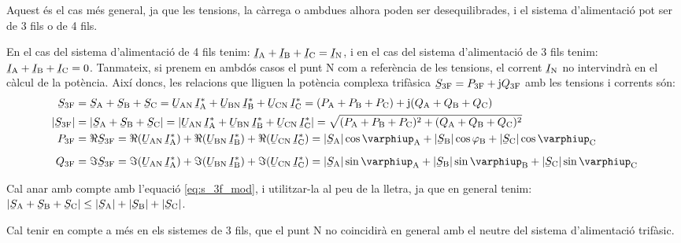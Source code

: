 Aquest és el cas més general, ja que les tensions, la càrrega o
ambdues alhora  poden ser desequilibrades, i el sistema
d'alimentació pot ser de 3 fils o de 4 fils.

En el cas del sistema d'alimentació de 4 fils tenim:
$\cmplx{I}\ped{A}+\cmplx{I}\ped{B}+\cmplx{I}\ped{C}=\cmplx{I}\ped{N}$, i
en el cas del sistema d'alimentació de 3 fils tenim:
$\cmplx{I}\ped{A}+\cmplx{I}\ped{B}+\cmplx{I}\ped{C}=0$. Tanmateix,
si prenem en ambdós casos el punt N com a referència de les
tensions, el corrent $\cmplx{I}\ped{N}$ no intervindrà en el càlcul de
la potència. Així doncs, les relacions que lliguen la potència
complexa trifàsica $\cmplx{S}\ped{3F} = P\ped{3F} + \ju Q\ped{3F}$
amb les tensions i corrents són:
\begin{align}
    \cmplx{S}\ped{3F} &= \cmplx{S}\ped{A} + \cmplx{S}\ped{B} + \cmplx{S}\ped{C} =
     \cmplx{U}\ped{AN}\, \cmplx{I}\ped{A}^* +
    \cmplx{U}\ped{BN} \,\cmplx{I}\ped{B}^* +  \cmplx{U}\ped{CN}\, \cmplx{I}\ped{C}^* =
    (P\ped{A} + P\ped{B} + P\ped{C}) + \ju (Q\ped{A} + Q\ped{B} + Q\ped{C}) \label{eq:s_3f} \\
    |\cmplx{S}\ped{3F}| &= |\cmplx{S}\ped{A} + \cmplx{S}\ped{B} + \cmplx{S}\ped{C}| =
    |\cmplx{U}\ped{AN}\, \cmplx{I}\ped{A}^* +
    \cmplx{U}\ped{BN} \,\cmplx{I}\ped{B}^* +  \cmplx{U}\ped{CN}\, \cmplx{I}\ped{C}^*| =
    \sqrt{(P\ped{A} + P\ped{B} + P\ped{C})^2 + (Q\ped{A} + Q\ped{B} + Q\ped{C})^2} \label{eq:s_3f_mod} \\
    P\ped{3F} &= \Re\cmplx{S}\ped{3F} = \Re(\cmplx{U}\ped{AN} \,\cmplx{I}\ped{A}^*) +
    \Re(\cmplx{U}\ped{BN} \,\cmplx{I}\ped{B}^*) +  \Re(\cmplx{U}\ped{CN}\,
    \cmplx{I}\ped{C}^*) = |\cmplx{S}\ped{A}| \cos \varphiup\ped{A} + |\cmplx{S}\ped{B}| \cos
    \varphi\ped{B} + |\cmplx{S}\ped{C}| \cos \varphiup\ped{C} \\[2mm]
    Q\ped{3F} &= \Im\cmplx{S}\ped{3F} = \Im(\cmplx{U}\ped{AN} \,\cmplx{I}\ped{A}^*) +
    \Im(\cmplx{U}\ped{BN} \,\cmplx{I}\ped{B}^*) +  \Im(\cmplx{U}\ped{CN}\,
    \cmplx{I}\ped{C}^*) = |\cmplx{S}\ped{A}| \sin \varphiup\ped{A} + |\cmplx{S}\ped{B}| \sin
    \varphiup\ped{B} + |\cmplx{S}\ped{C}| \sin \varphiup\ped{C}
\end{align}

Cal anar amb compte amb l'equació \eqref{eq:s_3f_mod}, i utilitzar-la al
peu de la lletra, ja
que en general tenim: $|\cmplx{S}\ped{A} + \cmplx{S}\ped{B} + \cmplx{S}\ped{C}| \leq
|\cmplx{S}\ped{A}| + |\cmplx{S}\ped{B}| + |\cmplx{S}\ped{C}|$.

Cal tenir en compte a més en els sistemes de 3 fils, que el punt
N no coincidirà en general amb el neutre del sistema
d'alimentació trifàsic.

